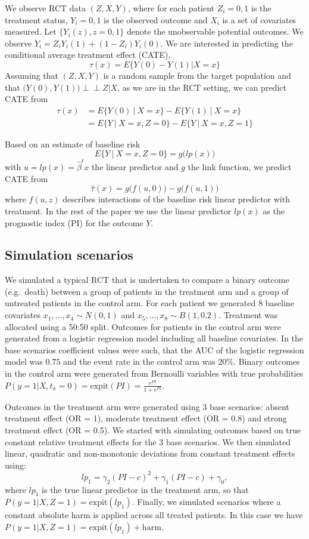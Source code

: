 \documentclass[]{elsarticle} %
\begin{document}
We observe RCT data \((Z, X, Y)\), where for each patient \(Z_i= 0, 1\)
is the treatment status, \(Y_i = 0, 1\) is the observed outcome and
\(X_i\) is a set of covariates measured. Let \(\{Y_i(z), z=0, 1\}\)
denote the unobservable potential outcomes. We observe
\(Y_i = Z_iY_i(1) + (1 - Z_i)Y_i(0)\). We are interested in predicting
the conditional average treatment effect (CATE),
\[\tau(x) = E\{Y(0) - Y(1)|X=x\}\] Assuming that \((Z, X, Y)\) is a
random sample from the target population and that
\(\big(Y(0), Y(1)\big)\perp \!\!\! \perp Z|X\), as we are in the RCT
setting, we can predict CATE from \begin{align*}
\tau(x) &= E\{Y(0)\:\vert\:X=x\}-E\{Y(1)\:\vert\:X=x\}\\
&=E\{Y\:\vert\:X=x, Z=0\}-E\{Y\:\vert\:X=x, Z=1\}
\end{align*}

Based on an estimate of baseline risk \[
E\{Y\:\vert\:X=x, Z=0\}=g\big(lp(x)\big)
\] with \(u=lp(x)=\hat{\beta}^tx\) the linear predictor and \(g\) the
link function, we predict CATE from \[
\hat{\tau}(x) = g\big(f(u, 0)\big) - g\big(f(u, 1)\big)
\] where \(f(u,z)\) describes interactions of the baseline risk linear
predictor with treatment. In the rest of the paper we use the linear
predictor \(lp(x)\) as the prognostic index (PI) for the outcome \(Y\).

\hypertarget{simulation-scenarios}{%
\subsection{Simulation scenarios}\label{simulation-scenarios}}

We simulated a typical RCT that is undertaken to compare a binary
outcome (e.g.~death) between a group of patients in the treatment arm
and a group of untreated patients in the control arm. For each patient
we generated 8 baseline covariates \(x_1,\dots,x_4\sim N(0, 1)\) and
\(x_5,\dots,x_8\sim B(1, 0.2)\). Treatment was allocated using a 50:50
split. Outcomes for patients in the control arm were generated from a
logistic regression model including all baseline covariates. In the base
scenarios coefficient values were such, that the AUC of the logistic
regression model was \(0.75\) and the event rate in the control arm was
\(20\%\). Binary outcomes in the control arm were generated from
Bernoulli variables with true probabilities
\(P(y=1|X, t_x = 0) = \text{expit}(PI)=\frac{e^{PI}}{1+e^{PI}}\).

Outcomes in the treatment arm were generated using 3 base scenarios:
absent treatment effect (OR = 1), moderate treatment effect (OR = 0.8)
and strong treatment effect (OR = 0.5). We started with simulating
outcomes based on true constant relative treatment effects for the 3
base scenarios. We then simulated linear, quadratic and non-monotonic
deviations from constant treatment effects using:
\[lp_1 = \gamma_2(PI-c)^2 + \gamma_1(PI-c) + \gamma_0, \] where \(lp_1\)
is the true linear predictor in the treatment arm, so that
\(P(y=1|X, Z=1) = \text{expit}(lp_1)\). Finally, we simulated scenarios
where a constant absolute harm is applied across all treated patients.
In this case we have
\(P(y=1|X,Z=1) = \text{expit}(lp_1) + \text{harm}\).
\end{document}
